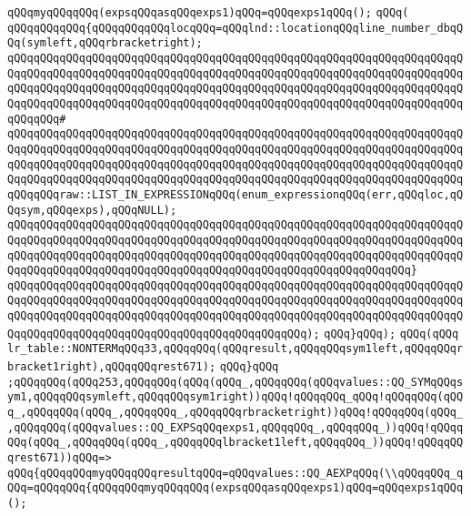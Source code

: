 \verb|qQQqmyqQQqqQQq(expsqQQqasqQQqexps1)qQQq=qQQqexps1qQQq();|\newline
\verb|qQQq(|\newline
\verb|qQQqqQQqqQQq{qQQqqQQqqQQqlocqQQq=qQQqlnd::locationqQQqline_number_dbqQQq(symleft,qQQqrbracketright);|\newline
\verb|qQQqqQQqqQQqqQQqqQQqqQQqqQQqqQQqqQQqqQQqqQQqqQQqqQQqqQQqqQQqqQQqqQQqqQQqqQQqqQQqqQQqqQQqqQQqqQQqqQQqqQQqqQQqqQQqqQQqqQQqqQQqqQQqqQQqqQQqqQQqqQQqqQQqqQQqqQQqqQQqqQQqqQQqqQQqqQQqqQQqqQQqqQQqqQQqqQQqqQQqqQQqqQQqqQQqqQQqqQQqqQQqqQQqqQQqqQQqqQQqqQQqqQQqqQQqqQQqqQQqqQQqqQQqqQQqqQQqqQQqqQQqqQQq#|\newline
\verb|qQQqqQQqqQQqqQQqqQQqqQQqqQQqqQQqqQQqqQQqqQQqqQQqqQQqqQQqqQQqqQQqqQQqqQQqqQQqqQQqqQQqqQQqqQQqqQQqqQQqqQQqqQQqqQQqqQQqqQQqqQQqqQQqqQQqqQQqqQQqqQQqqQQqqQQqqQQqqQQqqQQqqQQqqQQqqQQqqQQqqQQqqQQqqQQqqQQqqQQqqQQqqQQqqQQqqQQqqQQqqQQqqQQqqQQqqQQqqQQqqQQqqQQqqQQqqQQqqQQqqQQqqQQqqQQqqQQqqQQqqQQqqQQqraw::LIST_IN_EXPRESSIONqQQq(enum_expressionqQQq(err,qQQqloc,qQQqsym,qQQqexps),qQQqNULL);|\newline
\verb|qQQqqQQqqQQqqQQqqQQqqQQqqQQqqQQqqQQqqQQqqQQqqQQqqQQqqQQqqQQqqQQqqQQqqQQqqQQqqQQqqQQqqQQqqQQqqQQqqQQqqQQqqQQqqQQqqQQqqQQqqQQqqQQqqQQqqQQqqQQqqQQqqQQqqQQqqQQqqQQqqQQqqQQqqQQqqQQqqQQqqQQqqQQqqQQqqQQqqQQqqQQqqQQqqQQqqQQqqQQqqQQqqQQqqQQqqQQqqQQqqQQqqQQqqQQqqQQqqQQqqQQqqQQqqQQq}|\newline
\verb|qQQqqQQqqQQqqQQqqQQqqQQqqQQqqQQqqQQqqQQqqQQqqQQqqQQqqQQqqQQqqQQqqQQqqQQqqQQqqQQqqQQqqQQqqQQqqQQqqQQqqQQqqQQqqQQqqQQqqQQqqQQqqQQqqQQqqQQqqQQqqQQqqQQqqQQqqQQqqQQqqQQqqQQqqQQqqQQqqQQqqQQqqQQqqQQqqQQqqQQqqQQqqQQqqQQqqQQqqQQqqQQqqQQqqQQqqQQqqQQqqQQqqQQqqQQqqQQq);|\newline
\verb|qQQq}qQQq);|\newline
\verb|qQQq(qQQq|\newline
\verb|lr_table::NONTERMqQQq33,qQQqqQQq(qQQqresult,qQQqqQQqsym1left,qQQqqQQqrbracket1right),qQQqqQQqrest671);|\newline
\verb|qQQq}qQQq|\newline
\verb|;qQQqqQQq(qQQq253,qQQqqQQq(qQQq(qQQq_,qQQqqQQq(qQQqvalues::QQ_SYMqQQqsym1,qQQqqQQqsymleft,qQQqqQQqsym1right))qQQq!qQQqqQQq_qQQq!qQQqqQQq(qQQq_,qQQqqQQq(qQQq_,qQQqqQQq_,qQQqqQQqrbracketright))qQQq!qQQqqQQq(qQQq_,qQQqqQQq(qQQqvalues::QQ_EXPSqQQqexps1,qQQqqQQq_,qQQqqQQq_))qQQq!qQQqqQQq(qQQq_,qQQqqQQq(qQQq_,qQQqqQQqlbracket1left,qQQqqQQq_))qQQq!qQQqqQQqrest671))qQQq=>|\newline
\verb|qQQq{qQQqqQQqmyqQQqqQQqresultqQQq=qQQqvalues::QQ_AEXPqQQq(\\qQQqqQQq_qQQq=qQQqqQQq{qQQqqQQqmyqQQqqQQq(expsqQQqasqQQqexps1)qQQq=qQQqexps1qQQq();|\newline
